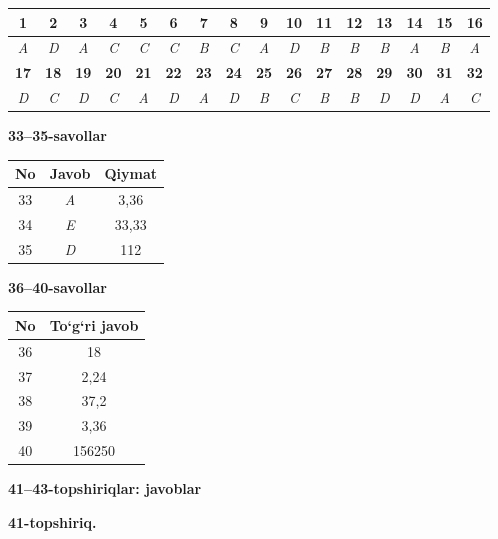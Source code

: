 \documentclass[11pt,a4paper]{article}
\begin{document}
\noindent\begin{tabular}{|c|c|c|c|c|c|c|c|c|c|c|c|c|c|c|c|}\hline
\textbf{1} & \textbf{2} & \textbf{3} & \textbf{4} & \textbf{5} & \textbf{6} & \textbf{7} & \textbf{8} & \textbf{9} & \textbf{10} & \textbf{11} & \textbf{12} & \textbf{13} & \textbf{14} & \textbf{15} & \textbf{16}\\\hline
\textsl{A} & \textsl{D} & \textsl{A} & \textsl{C} & \textsl{C} & \textsl{C} & \textsl{B} & \textsl{C} & \textsl{A} & \textsl{D} & \textsl{B} & \textsl{B} & \textsl{B} & \textsl{A} & \textsl{B} & \textsl{A}\\\hline
\textbf{17} & \textbf{18} & \textbf{19} & \textbf{20} & \textbf{21} & \textbf{22} & \textbf{23} & \textbf{24} & \textbf{25} & \textbf{26} & \textbf{27} & \textbf{28} & \textbf{29} & \textbf{30} & \textbf{31} & \textbf{32}\\\hline
\textsl{D} & \textsl{C} & \textsl{D} & \textsl{C} & \textsl{A} & \textsl{D} & \textsl{A} & \textsl{D} & \textsl{B} & \textsl{C} & \textsl{B} & \textsl{B} & \textsl{D} & \textsl{D} & \textsl{A} & \textsl{C}\\\hline
\end{tabular}\par\medskip
\noindent\textbf{33--35-savollar}\par\smallskip
\noindent\begin{tabular}{|c|c|c|}\hline \textbf{No} & \textbf{Javob} & \textbf{Qiymat}\\\hline
33 & \textsl{A} & 3,36\\\hline
34 & \textsl{E} & 33,33\\\hline
35 & \textsl{D} & 112\\\hline
\end{tabular}\par\medskip
\noindent\textbf{36--40-savollar}\par\smallskip
\noindent\begin{tabular}{|c|c|}\hline \textbf{No} & \textbf{To`g`ri javob}\\\hline
36 & 18\\\hline
37 & 2,24\\\hline
38 & 37,2\\\hline
39 & 3,36\\\hline
40 & 156250\\\hline
\end{tabular}\par\medskip
\noindent\textbf{41--43-topshiriqlar: javoblar}\par\smallskip
\noindent\textbf{41-topshiriq.}\par
\end{document}
